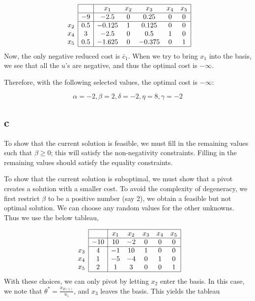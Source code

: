 $$
\begin{array}{c}
\\
 \\
x_2 \\
x_4 \\ 
x_5 \\
\end{array}
\begin{array}{|c|ccccc|}
    \hline
    & x_1 & x_2 & x_3 & x_4 & x_5\\ \hline
  -9 & -2.5 & 0 & 0.25 & 0 & 0\\ \hline
  0.5 & -0.125 & 1 & 0.125& 0 & 0\\
  3 & -2.5 & 0 & 0.5 & 1 & 0\\
  0.5 & -1.625 & 0 & -0.375 & 0 & 1\\\hline
\end{array}
$$
Now, the only negative reduced cost is $\bar{c}_1$. When we try to bring $x_1$ into the basis, we see that all the $u$'s are negative, and thus the optimal cost is $- \infty$.

Therefore, with the following selected values, the optimal cost is $-\infty$:

$$
\alpha=-2, \beta=2, \delta=-2, \eta=8, \gamma=-2
$$

\subsection*{c}
To show that the current solution is feasible, we must fill in the remaining values such that $\beta \geq 0$; this will satisfy the non-negativity constraints. Filling in the remaining values should satisfy the equality constraints.

To show that the current solution is suboptimal, we must show that a pivot creates a solution with a smaller cost. To avoid the complexity of degeneracy, we first restrict $\beta$ to be a positive number (say 2), we obtain a feasible but not optimal solution. We can choose any random values for the other unknowns. Thus we use the below tableau,


$$
\begin{array}{c}
\\
 \\
x_3 \\
x_4 \\ 
x_5 \\
\end{array}
\begin{array}{|c|ccccc|}
    \hline
    & x_1 & x_2 & x_3 & x_4 & x_5\\ \hline
  -10 & 10 & -2 & 0 & 0 & 0\\ \hline
  4 & -1 & 10 & 1 & 0 & 0\\
  1 & -5 & -4 & 0 & 1 & 0\\
  2 & 1 & 3 & 0 & 0 & 1\\\hline
\end{array}
$$
With these choices, we can only pivot by letting $x_2$ enter the basis. In this case, we note that $\theta^*=\frac{x_{B(1)}}{u_1}$, and $x_3$ leaves the basis. This yields the tableau

